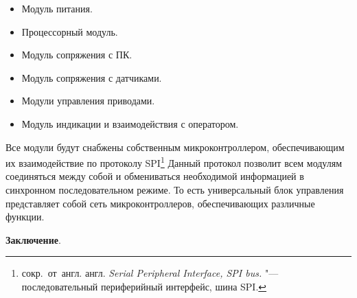 \begin{itemize}
\item Модуль питания.
\item Процессорный модуль.
\item Модуль сопряжения с ПК.
\item Модуль сопряжения с датчиками.
\item Модули управления приводами.
\item Модуль индикации и взаимодействия с оператором.
\end{itemize}

Все модули будут снабжены собственным микроконтроллером, обеспечивающим их взаимодействие по протоколу SPI\footnote{сокр.~от~англ. англ. \textit{Serial Peripheral Interface, SPI bus.} "--- последовательный периферийный интерфейс, шина SPI.} Данный протокол позволит всем модулям соединяться между собой и обмениваться необходимой информацией в синхронном последовательном режиме. То есть универсальный блок управления представляет собой сеть микроконтроллеров, обеспечивающих различные функции. 

\FloatBarrier                      
\textbf{Заключение}.


